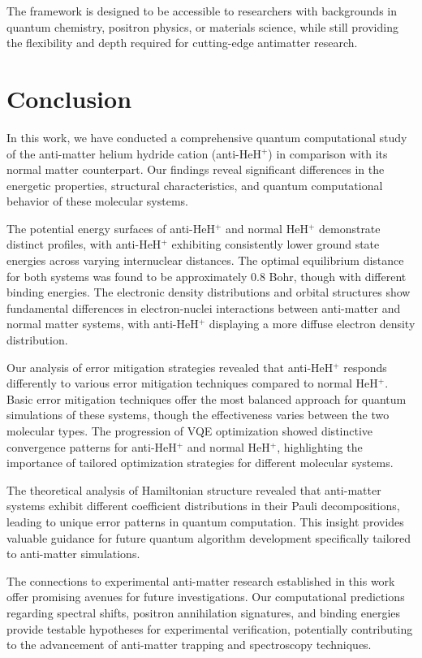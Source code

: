 \documentclass[10pt,twocolumn,a4paper]{article}
\begin{document}
The framework is designed to be accessible to researchers with backgrounds in quantum chemistry, positron physics, or materials science, while still providing the flexibility and depth required for cutting-edge antimatter research.

\section{Conclusion}
In this work, we have conducted a comprehensive quantum computational study of the anti-matter helium hydride cation (anti-HeH$^+$) in comparison with its normal matter counterpart. Our findings reveal significant differences in the energetic properties, structural characteristics, and quantum computational behavior of these molecular systems.

The potential energy surfaces of anti-HeH$^+$ and normal HeH$^+$ demonstrate distinct profiles, with anti-HeH$^+$ exhibiting consistently lower ground state energies across varying internuclear distances. The optimal equilibrium distance for both systems was found to be approximately 0.8 Bohr, though with different binding energies. The electronic density distributions and orbital structures show fundamental differences in electron-nuclei interactions between anti-matter and normal matter systems, with anti-HeH$^+$ displaying a more diffuse electron density distribution.

Our analysis of error mitigation strategies revealed that anti-HeH$^+$ responds differently to various error mitigation techniques compared to normal HeH$^+$. Basic error mitigation techniques offer the most balanced approach for quantum simulations of these systems, though the effectiveness varies between the two molecular types. The progression of VQE optimization showed distinctive convergence patterns for anti-HeH$^+$ and normal HeH$^+$, highlighting the importance of tailored optimization strategies for different molecular systems.

The theoretical analysis of Hamiltonian structure revealed that anti-matter systems exhibit different coefficient distributions in their Pauli decompositions, leading to unique error patterns in quantum computation. This insight provides valuable guidance for future quantum algorithm development specifically tailored to anti-matter simulations.

The connections to experimental anti-matter research established in this work offer promising avenues for future investigations. Our computational predictions regarding spectral shifts, positron annihilation signatures, and binding energies provide testable hypotheses for experimental verification, potentially contributing to the advancement of anti-matter trapping and spectroscopy techniques.
\end{document}
